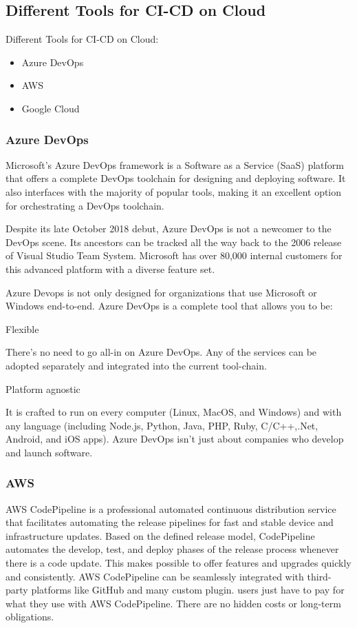 \subsection{Different Tools for CI-CD on Cloud}
%
Different Tools for CI-CD on Cloud:
   \begin{itemize}
     \item Azure DevOps
     \item AWS
     \item Google Cloud
   \end{itemize}


%
\subsubsection{Azure DevOps}
%

Microsoft's Azure DevOps framework is a Software as a Service (SaaS) platform that offers a complete DevOps toolchain for designing and deploying software. It also interfaces with the majority of popular tools, making it an excellent option for orchestrating a DevOps toolchain.


Despite its late October 2018 debut, Azure DevOps is not a newcomer to the DevOps scene. Its ancestors can be tracked all the way back to the 2006 release of Visual Studio Team System. Microsoft has over 80,000 internal customers for this advanced platform with a diverse feature set.


Azure Devops is not only designed for organizations that use Microsoft or Windows end-to-end. Azure DevOps is a complete tool that allows you to be:


Flexible

There's no need to go all-in on Azure DevOps. Any of the services can be adopted separately and integrated into the current tool-chain.
\newline

Platform agnostic

It is crafted to run on every computer (Linux, MacOS, and Windows) and with any language (including Node.js, Python, Java, PHP, Ruby, C/C++,.Net, Android, and iOS apps). Azure DevOps isn't just about companies who develop and launch software.


%
\subsubsection{AWS}
%

AWS CodePipeline is a professional automated continuous distribution service that facilitates automating the release pipelines for fast and stable device and infrastructure updates. Based on the defined release model, CodePipeline automates the develop, test, and deploy phases of the release process whenever there is a code update. This makes possible to offer features and upgrades quickly and consistently. AWS CodePipeline can be seamlessly integrated with third-party platforms like GitHub and many custom plugin. users just have to pay for what they use with AWS CodePipeline. There are no hidden costs or long-term obligations.


